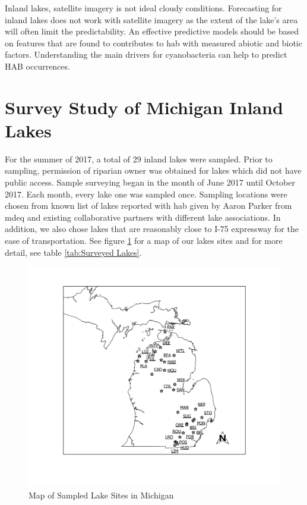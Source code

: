 Inland lakes, satellite imagery is not ideal cloudy conditions. Forecasting for inland lakes does not work with satellite imagery as the extent of the lake's area will often limit the predictability. An effective predictive models should be based on features that are found to contributes to \gls{hab} with measured abiotic and biotic factors. Understanding the main drivers for cyanobacteria can help to predict HAB occurrences.

\section{Survey Study of Michigan Inland Lakes} 
For the summer of 2017, a total of 29 inland lakes were sampled. Prior to sampling, permission of riparian owner was obtained for lakes which did not have public access. Sample surveying began in the month of June 2017 until October 2017. Each month, every lake one was sampled once. Sampling locations were chosen from known list of lakes reported with \gls{hab} given by Aaron Parker from \gls{mdeq} and existing collaborative partners with different lake associations. In addition, we also chose lakes that are reasonably close to I-75 expressway for the ease of transportation. See figure \ref{fig:overview} for a map of our lakes sites and for more detail, see table \ref{tab:Surveyed Lakes}.

\begin{figure}[!h]
\includegraphics[width=\textwidth]{figures/Overview}
\caption{Map of Sampled Lake Sites in Michigan}
\label{fig:overview}
\end{figure}

